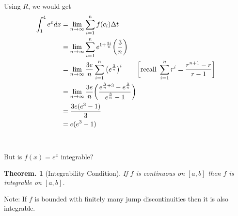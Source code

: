 \documentclass[11pt, a4paper]{memoir}
\theoremstyle{change}
\newtheorem{theorem}{Theorem.}[section]
\theoremstyle{plain}
\theoremstyle{nonumberplain}
\numberwithin{equation}{section}
\begin{document}
Using $R$, we would get
\begin{align*}
    \int^4_1 e^x \space dx &= \lim_{n \to \infty} \sum^n_{i=1}f(c_i)\space \Delta t\\
    &= \lim_{n \to \infty} \sum^{n}_{i=1} e^{ \space 1 + \frac{3i}{n}} \bigg(\frac{3}{n} \bigg)\\
    &= \lim_{n \to \infty} \frac{3e}{n} \sum^n_{i=1} \big(e^{\frac{3}{n}}\big)^i \; \; \; \; \; \; \; \; \bigg[\text{recall } \sum^{n}_{i=1}r^i  = \frac{r^{n+1} - r}{r - 1}\bigg]\\
    &= \lim_{n \to \infty} \frac{3e}{n}\bigg(\frac{e^{\frac{3}{n} + 3} - e^{\frac{3}{n}}}{e^{\frac{3}{n} } - 1}\bigg)\\
    &= \frac{3e (e^3 - 1)}{3}\\
    &= e(e^3 - 1)
\end{align*} \\ \space \\
But is $f(x) = e^x $ integrable$?$
\begin{theorem}[Integrability Condition]
If $f$ is continuous on $[a, b]$ then $f$ is integrable on $[a, b]$.
\end{theorem}
Note: If $f$ is bounded with finitely many jump discontinuities then it is also integrable.
\end{document}
